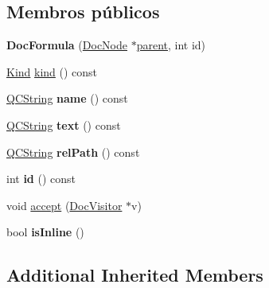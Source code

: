 \subsection*{Membros públicos}
\begin{DoxyCompactItemize}
\item 
\hypertarget{class_doc_formula_a7f244857076eb29b11e4351066fd8417}{{\bfseries Doc\-Formula} (\hyperlink{class_doc_node}{Doc\-Node} $\ast$\hyperlink{class_doc_node_abd7f070d6b0a38b4da71c2806578d19d}{parent}, int id)}\label{class_doc_formula_a7f244857076eb29b11e4351066fd8417}

\item 
\hyperlink{class_doc_node_aa10c9e8951b8ccf714a59ec321bdac5b}{Kind} \hyperlink{class_doc_formula_aa9d037bed9f9a083d0cd01485637d843}{kind} () const 
\item 
\hypertarget{class_doc_formula_af92302878527ec555ba9e3fe066925ff}{\hyperlink{class_q_c_string}{Q\-C\-String} {\bfseries name} () const }\label{class_doc_formula_af92302878527ec555ba9e3fe066925ff}

\item 
\hypertarget{class_doc_formula_a367883e6ba4151924745ee021c01b5e7}{\hyperlink{class_q_c_string}{Q\-C\-String} {\bfseries text} () const }\label{class_doc_formula_a367883e6ba4151924745ee021c01b5e7}

\item 
\hypertarget{class_doc_formula_a3aa6799d4713d51d9cc4862af165671c}{\hyperlink{class_q_c_string}{Q\-C\-String} {\bfseries rel\-Path} () const }\label{class_doc_formula_a3aa6799d4713d51d9cc4862af165671c}

\item 
\hypertarget{class_doc_formula_ae0c063cfb2479f614be43b9d2f92ba63}{int {\bfseries id} () const }\label{class_doc_formula_ae0c063cfb2479f614be43b9d2f92ba63}

\item 
void \hyperlink{class_doc_formula_a7ba716e854ae2f8f87a4eb2140e302b6}{accept} (\hyperlink{class_doc_visitor}{Doc\-Visitor} $\ast$v)
\item 
\hypertarget{class_doc_formula_a4a3aafabdcfff5a81ef37790d77d30fc}{bool {\bfseries is\-Inline} ()}\label{class_doc_formula_a4a3aafabdcfff5a81ef37790d77d30fc}

\end{DoxyCompactItemize}
\subsection*{Additional Inherited Members}


